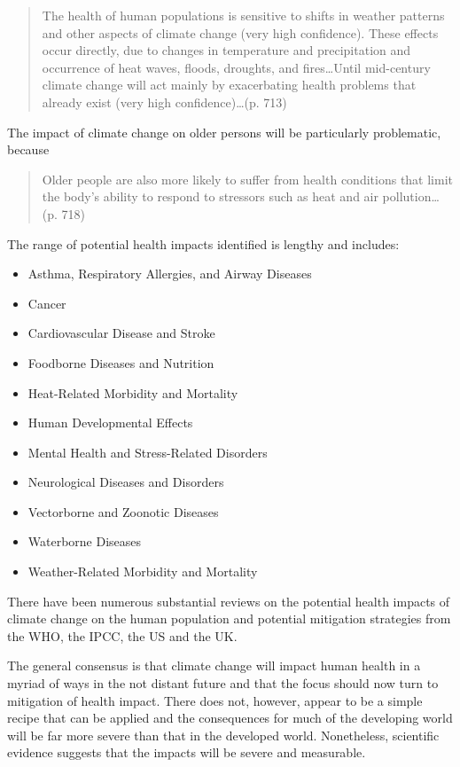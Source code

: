 \begin{quotation}
The health of human populations is sensitive to shifts in weather patterns and other aspects of climate change (very high
confidence). These effects occur directly, due to changes in temperature and precipitation and occurrence of heat waves, floods, droughts, and fires\ldots Until mid-century climate change will act mainly by exacerbating health problems that already exist (very high confidence)\ldots (p. 713)\cite{IPCC2014}
\end{quotation}

The impact of climate change on older persons will be particularly problematic, because

\begin{quotation}
Older people are also more likely to suffer from health conditions that limit the body's ability to respond to stressors such as heat and air pollution\ldots (p. 718)
\end{quotation}

The range of potential health impacts identified is lengthy and includes:\cite{Portier2010}
\begin{itemize}
\item Asthma, Respiratory Allergies, and Airway Diseases
\item Cancer
\item Cardiovascular Disease and Stroke
\item Foodborne Diseases and Nutrition
\item Heat-Related Morbidity and Mortality
\item Human Developmental Effects
\item Mental Health and Stress-Related Disorders
\item Neurological Diseases and Disorders
\item Vectorborne and Zoonotic Diseases
\item Waterborne Diseases
\item Weather-Related Morbidity and Mortality
\end{itemize}

There have been numerous substantial reviews on the potential health impacts of climate change on the human population and potential mitigation strategies from the WHO\cite{WHO2014a,WHO2014b, WHO2015}, the IPCC\cite{IPCC2014}, the US\cite{Portier2010, Luber2014} and the UK\cite{HPA2012, LancetCom2015}.


The general consensus is that climate change will impact human health in a myriad of ways in the not distant future and that the focus should now turn to mitigation of health impact. There does not, however, appear to be a simple recipe that can be applied and the consequences for much of the developing world will be far more severe than that in the developed world. Nonetheless, scientific evidence suggests that the impacts will be severe and measurable.


